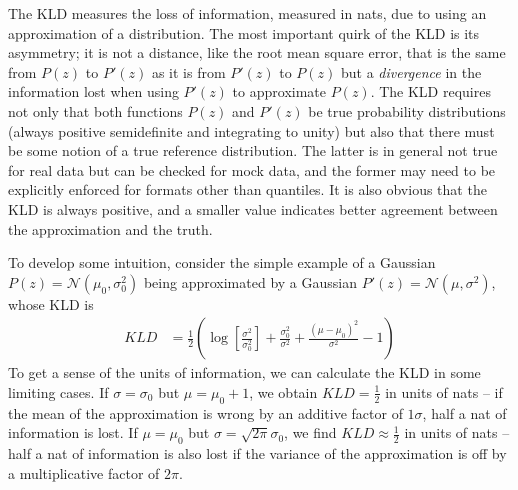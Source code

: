 \documentclass[\docopts]{\docclass}
\begin{document}
The KLD measures the loss of information, measured in nats, due to using an
approximation of a distribution.  The most important quirk of the KLD is its
asymmetry; it is not a distance, like the root mean square error, that is the
same from $P(z)$ to $P'(z)$ as it is from $P'(z)$ to $P(z)$ but a
\textit{divergence} in the information lost when using $P'(z)$ to approximate
$P(z)$.  The KLD requires not only that both functions $P(z)$ and $P'(z)$ be
true probability distributions (always positive semidefinite and integrating to
unity) but also that there must be some notion of a true reference
distribution.  The latter is in general not true for real data but can be
checked for mock data, and the former may need to be explicitly enforced for
formats other than quantiles.  It is also obvious that the KLD is always
positive, and a smaller value indicates better agreement between the
approximation and the truth.

To develop some intuition, consider the simple example of a Gaussian
$P(z)=\mathcal{N}(\mu_{0}, \sigma_{0}^{2})$ being approximated by a Gaussian
$P'(z)=\mathcal{N}(\mu, \sigma^{2})$, whose KLD is
\begin{align}
  \label{eq:gaussian}
  KLD &= \frac{1}{2}\left(\log\left[\frac{\sigma^{2}}{\sigma_{0}^{2}}\right] +
\frac{\sigma_{0}^{2}}{\sigma^{2}} + \frac{(\mu-\mu_{0})^{2}}{\sigma^{2}} -
1\right)
\end{align}
To get a sense of the units of information, we can calculate the KLD in some
limiting cases.  If $\sigma=\sigma_{0}$ but $\mu=\mu_{0}+1$, we obtain
$KLD=\frac{1}{2}$ in units of nats -- if the mean of the approximation is wrong
by an additive factor of $1\sigma$, half a nat of information is lost.  If
$\mu=\mu_{0}$ but $\sigma=\sqrt{2\pi}\sigma_{0}$, we find
$KLD\approx\frac{1}{2}$ in units of nats -- half a nat of information is also
lost if the variance of the approximation is off by a multiplicative factor of
$2\pi$.
\end{document}
